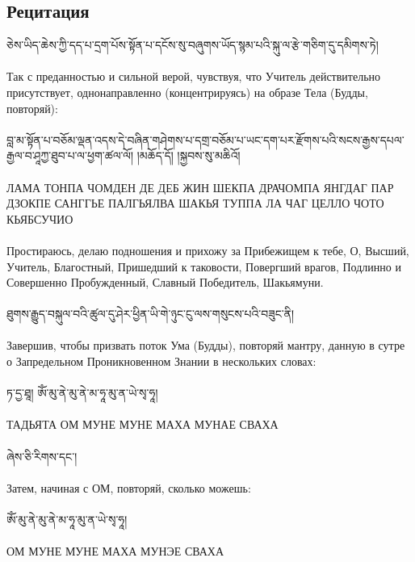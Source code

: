 \subsection{Рецитация}
\scriptsize
\ti
ཅེས་ཡིད་ཆེས་ཀྱི་དད་པ་དྲག་པོས་སྟོན་པ་དངོས་སུ་བཞུགས་ཡོད་སྙམ་པའི་སྐུ་ལ་རྩེ་གཅིག་དུ་དམིགས་ཏེ།\\
\\
\ru
Так с преданностью и сильной верой, чувствуя, что Учитель действительно присутствует,
однонаправленно (концентрируясь) на образе Тела (Будды, повторяй):\\
\\
\normalsize
\ti
བླ་མ་སྟོན་པ་བཅོམ་ལྡན་འདས་དེ་བཞིན་གཤེགས་པ་དགྲ་བཅོམ་པ་ཡང་དག་པར་རྫོགས་པའི་སངས་རྒྱས་དཔལ་རྒྱལ་བ་ཤཱཀྱ་ཐུབ་པ་ལ་ཕྱག་ཚལ་ལོ། 
།མཆོད་དོ། །སྐྱབས་སུ་མཆིའོ། \\
\\
\ru
ЛАМА ТОНПА ЧОМДЕН ДЕ ДЕБ ЖИН ШЕКПА ДРАЧОМПА ЯНГДАГ ПАР ДЗОКПЕ
САНГГЬЕ ПАЛГЬЯЛВА ШАКЬЯ ТУППА ЛА ЧАГ ЦЕЛЛО ЧОТО КЬЯБСУЧИО\\
\\
Простираюсь, делаю подношения и прихожу за Прибежищем к тебе, О, Высший, Учитель, Благостный,
Пришедший к таковости, Повергший врагов, Подлинно и Совершенно Пробужденный,
Славный Победитель, Шакьямуни.\\
\\
\scriptsize
\ti
ཐུགས་རྒྱུད་བསྐུལ་བའི་ཚུལ་དུ་ཤེར་ཕྱིན་ཡི་གེ་ཉུང་ངུ་ལས་གསུངས་པའི་བཟུང་ནི།\\
\\
\ru
Завершив, чтобы призвать поток Ума (Будды), повторяй мантру,
данную в сутре о Запредельном Проникновенном Знании в нескольких словах:\\
\\
\normalsize
\ti
ཏ་དྱ་ཐཱ། ཨོཾ་མུ་ནེ་མུ་ནེ་མ་ཧཱ་མུ་ན་ཡེ་སྭ་ཧཱ།\\
\\
\ru
ТАДЬЯТА ОМ МУНЕ МУНЕ МАХА МУНАЕ СВАХА\\
\\
\scriptsize
\ti ཞེས་ཅི་རིགས་དང་།\\
\\
\ru Затем, начиная с ОМ, повторяй, сколько можешь:\\
\\
\normalsize
\ti ཨོཾ་མུ་ནེ་མུ་ནེ་མ་ཧཱ་མུ་ན་ཡེ་སྭ་ཧཱ།\\
\\
\ru  ОМ МУНЕ МУНЕ МАХА МУНЭЕ СВАХА\\
\\
\newpage
